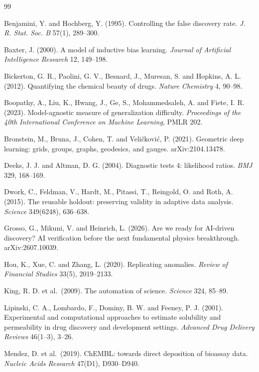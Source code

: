 \documentclass[11pt]{article}
\begin{document}
\begin{thebibliography}{99}

 Benjamini, Y. and Hochberg, Y. (1995). Controlling the
false discovery rate. \emph{J. R. Stat. Soc. B} 57(1), 289--300.

 Baxter, J. (2000). A model of inductive bias learning.
\emph{Journal of Artificial Intelligence Research} 12, 149--198.

 Bickerton, G. R., Paolini, G. V., Besnard, J., Muresan,
S. and Hopkins, A. L. (2012). Quantifying the chemical beauty of drugs.
\emph{Nature Chemistry} 4, 90--98.

 Boopathy, A., Liu, K., Hwang, J., Ge, S.,
Mohammedsaleh, A. and Fiete, I. R. (2023). Model-agnostic measure of
generalization difficulty. \emph{Proceedings of the 40th International
Conference on Machine Learning}, PMLR 202.

 Bronstein, M., Bruna, J., Cohen, T. and
Veli\v{c}kovi\'{c}, P. (2021). Geometric deep learning: grids, groups,
graphs, geodesics, and gauges. arXiv:2104.13478.

 Deeks, J. J. and Altman, D. G. (2004). Diagnostic tests 4:
likelihood ratios. \emph{BMJ} 329, 168--169.

 Dwork, C., Feldman, V., Hardt, M., Pitassi, T., Reingold, O.
and Roth, A. (2015). The reusable holdout: preserving validity in adaptive
data analysis. \emph{Science} 349(6248), 636--638.

 Grosso, G., Mikuni, V. and Heinrich, L. (2026). Are we
ready for AI-driven discovery? AI verification before the next fundamental
physics breakthrough. arXiv:2607.10039.

 Hou, K., Xue, C. and Zhang, L. (2020). Replicating anomalies.
\emph{Review of Financial Studies} 33(5), 2019--2133.

 King, R. D. et al.\ (2009). The automation of science.
\emph{Science} 324, 85--89.

 Lipinski, C. A., Lombardo, F., Dominy, B. W. and Feeney,
P. J. (2001). Experimental and computational approaches to estimate
solubility and permeability in drug discovery and development settings.
\emph{Advanced Drug Delivery Reviews} 46(1--3), 3--26.

 Mendez, D. et al.\ (2019). ChEMBL: towards direct
deposition of bioassay data. \emph{Nucleic Acids Research} 47(D1),
D930--D940.


\end{thebibliography}
\end{document}
